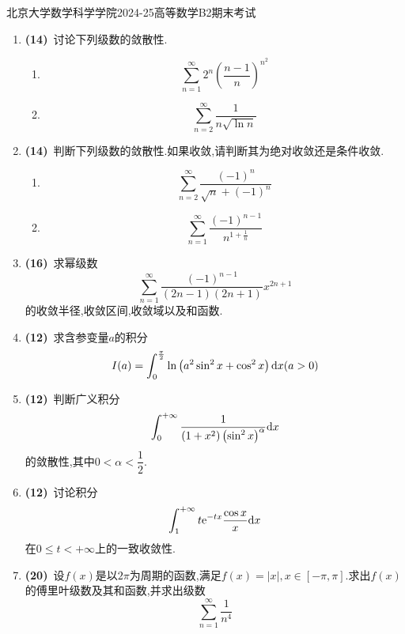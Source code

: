 \documentclass{ctexart}
\begin{document}
\pagestyle{empty}
\begin{center}\Large
    北京大学数学科学学院2024-25高等数学B2期末考试
\end{center}
\begin{enumerate}[leftmargin=*,label=\textbf{\arabic*.},topsep=0pt,parsep=0pt,itemsep=0pt,partopsep=0pt]
    \item \textbf{(14)}\ 讨论下列级数的敛散性.
        \begin{enumerate}[label=\tbf{(\arabic*)},topsep=0pt,parsep=0pt,itemsep=0pt,partopsep=0pt]
            \item \[\sum_{n=1}^{\infty}2^n\left(\dfrac{n-1}{n}\right)^{n^2}\]
            \item \[\sum_{n=2}^{\infty}\dfrac{1}{n\sqrt{\ln n}}\]
        \end{enumerate}

    \item \textbf{(14)}\ 判断下列级数的敛散性.如果收敛,请判断其为绝对收敛还是条件收敛.
        \begin{enumerate}[label=\tbf{(\arabic*)},topsep=0pt,parsep=0pt,itemsep=0pt,partopsep=0pt]
            \item \[\sum_{n=2}^{\infty}\dfrac{(-1)^n}{\sqrt{n}+(-1)^n}\]
            \item \[\sum_{n=1}^{\infty}\dfrac{(-1)^{n-1}}{n^{1+\frac1n}}\]
        \end{enumerate}

    \item \textbf{(16)}\ 求幂级数
        \[\sum_{n=1}^{\infty}\dfrac{(-1)^{n-1}}{(2n-1)(2n+1)}x^{2n+1}\]
        的收敛半径,收敛区间,收敛域以及和函数.

    \item \textbf{(12)}\ 求含参变量$a$的积分
        \[I(a)=\int_0^{\frac\pi2}\ln\left(a^2\sin^2x+\cos^2x\right)\mathrm{d} x(a>0)\]
        
    \item \textbf{(12)}\ 判断广义积分
        \[\int_0^{+\infty}\dfrac{1}{\left(1+x^2\right)\left(\sin^2 x\right)^\alpha}\mathrm{d} x\]
        的敛散性,其中$0<\alpha<\dfrac12$.

    \item \textbf{(12)}\ 讨论积分
        \[\int_1^{+\infty}t\mathrm{e}^{-tx}\dfrac{\cos x}{x}\mathrm{d} x\]
        在$0\leqslant t<+\infty$上的一致收敛性.

    \item \textbf{(20)}\ 设$f(x)$是以$2\pi$为周期的函数,满足$f(x)=|x|,x\in[-\pi,\pi]$.求出$f(x)$的傅里叶级数及其和函数,并求出级数
        \[\sum_{n=1}^{\infty}\dfrac{1}{n^4}\]
    
\end{enumerate}
\end{document}

